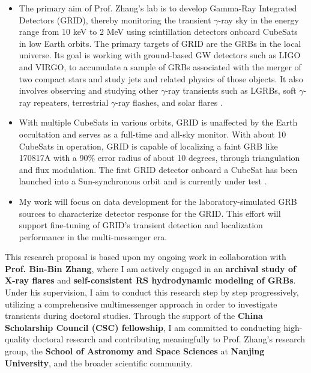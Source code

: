 \begin{itemize}
    \itemsep0em 
    \item The primary aim of Prof. Zhang’s lab is to develop Gamma-Ray Integrated Detectors (GRID), thereby monitoring the transient $\gamma$-ray sky in the energy range from 10 keV to 2 MeV using scintillation detectors onboard CubeSats in low Earth orbits. The primary targets of GRID are the GRBs in the local universe. Its goal is working with ground-based GW detectors such as LIGO and VIRGO, to accumulate a sample of GRBs associated with the merger of two compact stars and study jets and related physics of those objects. It also involves observing and studying other $\gamma$-ray transients such as LGRBs, soft $\gamma$-ray repeaters, terrestrial $\gamma$-ray flashes, and solar flares \cite{Wen_2019}.
    
    \item With multiple CubeSats in various orbits, GRID is unaffected by the Earth occultation and serves as a full-time and all-sky monitor. With about 10 CubeSats in operation, GRID is capable of localizing a faint GRB like 170817A with a 90\% error radius of about 10 degrees, through triangulation and flux modulation. The first GRID detector onboard a CubeSat has been launched into a Sun-synchronous orbit and is currently under test \cite{Wen_2019}.
    \item My work will focus on data development for the laboratory-simulated GRB sources to characterize detector response for the GRID. This effort will support fine-tuning of GRID’s transient detection and localization performance in the multi-messenger era. 
\end{itemize}

\vspace{0.10 cm}

This research proposal is based upon my ongoing work in collaboration with \textbf{Prof. Bin-Bin Zhang}, where I am actively engaged in an \textbf{archival study of X-ray flares} and \textbf{self-consistent RS hydrodynamic modeling of GRBs}. Under his supervision, I aim to conduct this research step by step progressively, utilizing a comprehensive multimessenger approach in order to investigate transients during doctoral studies. Through the support of the \textbf{China Scholarship Council (CSC) fellowship}, I am committed to conducting high-quality doctoral research and contributing meaningfully to Prof. Zhang's research group, the \textbf{School of Astronomy and Space Sciences} at \textbf{Nanjing University}, and the broader scientific community.


